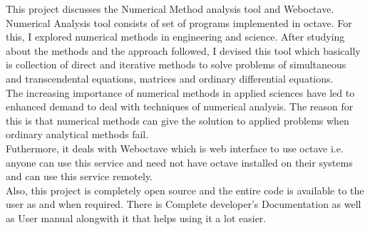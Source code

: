 \begin{Huge}
\end{Huge}

This project discusses the Numerical Method analysis tool and Weboctave. Numerical Analysis tool consists of set of programs implemented in octave. For this, I explored numerical methods in engineering and science. After studying about the methods and the approach followed, I devised this tool which basically is collection of direct and iterative methods to solve problems of simultaneous and transcendental equations, matrices and ordinary differential equations. \\  

The increasing importance of numerical methods in applied sciences have led to enhanced demand to deal with techniques of numerical analysis. The reason for this is that numerical methods can give the solution to applied problems when ordinary analytical methods fail.\\

Futhermore, it deals with Weboctave which is web interface to use octave i.e. anyone can use this service and need not have octave installed on their systems and can use this service remotely.\\

Also, this project is completely open source and the entire code is available 
to the user as and when required. There is Complete developer's 
Documentation as well as User manual alongwith it that helps using it a lot easier.